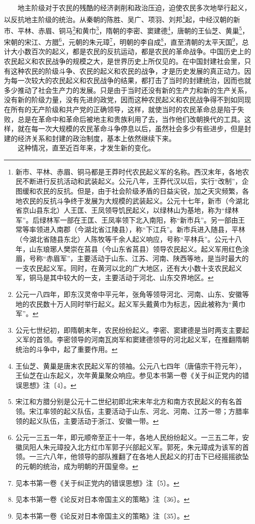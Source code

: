 \documentclass[cn,11pt,chinese]{elegantbook}
\begin{document}
　　地主阶级对于农民的残酷的经济剥削和政治压迫，迫使农民多次地举行起义，以反抗地主阶级的统治。从秦朝的陈胜、吴广、项羽、刘邦\footnote[7]{ 新市、平林、赤眉、铜马都是王莽时代农民起义军的名称。西汉末年，各地农民不断进行反抗活动和武装起义。公元八年，王莽代汉以后，实行“改制”，企图缓和农民的反抗。但是，由于社会阶级矛盾的日益尖锐，加之天灾频繁，各地农民的反抗斗争终于发展为大规模的武装起义。公元十七年，新市（今湖北省京山县东北）人王匡、王凤领导饥民起义，以绿林山为基地，称为“绿林军”。后绿林军一部在王匡、王凤率领下北入南阳，称“新市兵”。另一部由王常等率领进入南郡（今湖北省江陵县），称“下江兵”。新市兵进入随县，平林（今湖北省随县东北）人陈牧等千余人起义响应，号称“平林兵”。公元十八年，山东琅琊人樊崇在莒县（今山东省莒县）领导农民起义。起义军用红色涂眉，号称“赤眉军”，主要活动于山东、江苏、河南、陕西等地，是当时最大的一支农民起义军。同时，在黄河以北的广大地区，还有大小数十支农民起义军，铜马是其中较大的一支，主要活动于河北、山东交界地区。}起，中经汉朝的新市、平林、赤眉、铜马\footnote[8]{ 公元一八四年，即东汉灵帝中平元年，张角等领导河北、河南、山东、安徽等地的农民数十万人同时举行起义。起义军头戴黄巾为标志，因此被称为“黄巾军”。}和黄巾\footnote[9]{ 公元七世纪初，即隋朝末年，农民纷纷起义。李密、窦建德是当时两支主要起义军的首领。李密领导的河南瓦岗军和窦建德领导的河北起义军，在推翻隋朝统治的斗争中，起了重要作用。}，隋朝的李密、窦建德\footnote[10]{ 王仙芝、黄巢是唐末农民起义军的领袖。公元八七四年（唐僖宗干符元年），王仙芝在山东起义，次年黄巢聚众响应。参见本书第一卷《关于纠正党内的错误思想》注〔4〕。}，唐朝的王仙芝、黄巢\footnote[11]{ 宋江和方腊分别是公元十二世纪初即北宋末年北方和南方农民起义的有名首领。宋江率领的起义队伍，主要活动于山东、河北、河南、江苏一带；方腊率领的起义队伍，主要活动于浙江、安徽一带。}，宋朝的宋江、方腊\footnote[12]{ 公元一三五一年，即元顺帝至正十一年，各地人民纷纷起义。一三五二年，安徽凤阳人朱元璋投入北方红巾军郭子兴部起义军。郭死，朱元璋成为该军的首领。一三六八年，他领导的部队推翻了在各地人民起义的打击下已经摇摇欲坠的元朝的统治，成为明朝的开国皇帝。}，元朝的朱元璋\footnote[13]{ 见本书第一卷《关于纠正党内的错误思想》注〔5〕。}，明朝的李自成\footnote[14]{ 见本书第一卷《论反对日本帝国主义的策略》注〔36〕。}，直至清朝的太平天国\footnote[15]{ 见本书第一卷《论反对日本帝国主义的策略》注〔35〕。}，总计大小数百次的起义，都是农民的反抗运动，都是农民的革命战争。中国历史上的农民起义和农民战争的规模之大，是世界历史上所仅见的。在中国封建社会里，只有这种农民的阶级斗争、农民的起义和农民的战争，才是历史发展的真正动力。因为每一次较大的农民起义和农民战争的结果，都打击了当时的封建统治，因而也就多少推动了社会生产力的发展。只是由于当时还没有新的生产力和新的生产关系，没有新的阶级力量，没有先进的政党，因而这种农民起义和农民战争得不到如同现在所有的无产阶级和共产党的正确领导，这样，就使当时的农民革命总是陷于失败，总是在革命中和革命后被地主和贵族利用了去，当作他们改朝换代的工具。这样，就在每一次大规模的农民革命斗争停息以后，虽然社会多少有些进步，但是封建的经济关系和封建的政治制度，基本上依然继续下来。\\
　　这种情况，直至近百年来，才发生新的变化。\\
\end{document}
